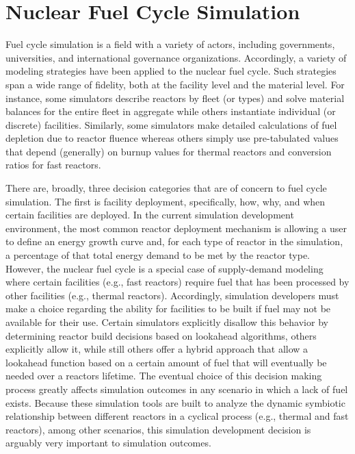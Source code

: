 
\section{Nuclear Fuel Cycle Simulation}\label{intro:fcs}
 
Fuel cycle simulation is a field with a variety of actors, including
governments, universities, and international governance
organizations. Accordingly, a variety of modeling strategies have been applied
to the nuclear fuel cycle. Such strategies span a wide range of fidelity, both
at the facility level and the material level. For instance, some simulators
describe reactors by fleet (or types) and solve material balances for the entire
fleet in aggregate while others instantiate individual (or discrete)
facilities. Similarly, some simulators make detailed calculations of fuel
depletion due to reactor fluence whereas others simply use pre-tabulated values
that depend (generally) on burnup values for thermal reactors and conversion
ratios for fast reactors.

There are, broadly, three decision categories that are of concern to fuel cycle
simulation. The first is facility deployment, specifically, how, why, and when
certain facilities are deployed. In the current simulation development
environment, the most common reactor deployment mechanism is allowing a user to
define an energy growth curve and, for each type of reactor in the simulation, a
percentage of that total energy demand to be met by the reactor type. However,
the nuclear fuel cycle is a special case of supply-demand modeling where certain
facilities (e.g., fast reactors) require fuel that has been processed by other
facilities (e.g., thermal reactors). Accordingly, simulation developers must
make a choice regarding the ability for facilities to be built if fuel may not
be available for their use. Certain simulators explicitly disallow this behavior
by determining reactor build decisions based on lookahead algorithms, others
explicitly allow it, while still others offer a hybrid approach that allow a
lookahead function based on a certain amount of fuel that will eventually be
needed over a reactors lifetime. The eventual choice of this decision making
process greatly affects simulation outcomes in any scenario in which a lack of
fuel exists. Because these simulation tools are built to analyze the dynamic
symbiotic relationship between different reactors in a cyclical process (e.g.,
thermal and fast reactors), among other scenarios, this simulation development
decision is arguably very important to simulation outcomes.

